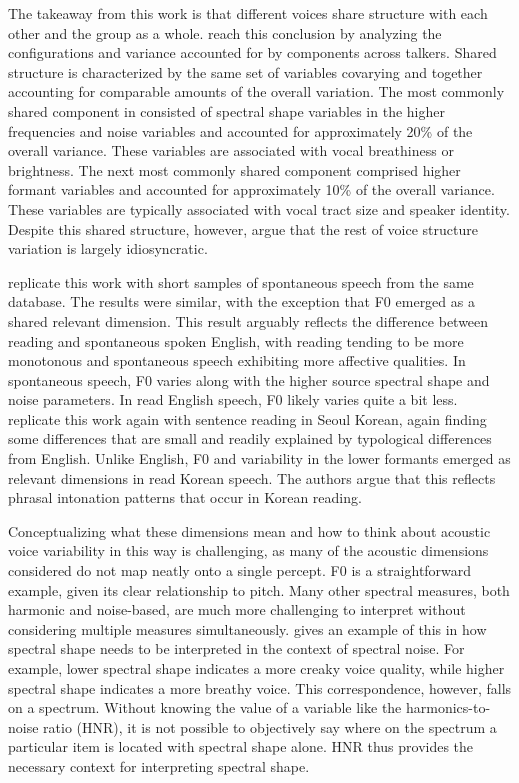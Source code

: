 The takeaway from this work is that different voices share structure with each other and the group as a whole. \citet{lee_2019_acoustic} reach this conclusion by analyzing the configurations and variance accounted for by components across talkers. Shared structure is characterized by the same set of variables covarying and together accounting for comparable amounts of the overall variation. The most commonly shared component in \citet{lee_2019_acoustic} consisted of spectral shape variables in the higher frequencies and noise variables and accounted for approximately 20\% of the overall variance. These variables are associated with vocal breathiness or brightness. The next most commonly shared component comprised higher formant variables and accounted for approximately 10\% of the overall variance. These variables are typically associated with vocal tract size and speaker identity. Despite this shared structure, however, \citet{lee_2019_acoustic} argue that the rest of voice structure variation is largely idiosyncratic. 

\citet{lee_2019_spontaneous} replicate this work with short samples of spontaneous speech from the same database. The results were similar, with the exception that F0 emerged as a shared relevant dimension. This result arguably reflects the difference between reading and spontaneous spoken English, with reading tending to be more monotonous and spontaneous speech exhibiting more affective qualities. In spontaneous speech, F0 varies along with the higher source spectral shape and noise parameters. In read English speech, F0 likely varies quite a bit less. \citet{lee_2020_language} replicate this work again with sentence reading in Seoul Korean, again finding some differences that are small and readily explained by typological differences from English. Unlike English, F0 and variability in the lower formants emerged as relevant dimensions in read Korean speech. The authors argue that this reflects phrasal intonation patterns that occur in Korean reading. 

Conceptualizing what these dimensions mean and how to think about acoustic voice variability in this way is challenging, as many of the acoustic dimensions considered do not map neatly onto a single percept. F0 is a straightforward example, given its clear relationship to pitch. Many other spectral measures, both harmonic and noise-based, are much more challenging to interpret without considering multiple measures simultaneously. \citet{garellek_2019_voice} gives an example of this in how spectral shape needs to be interpreted in the context of spectral noise. For example, lower spectral shape indicates a more creaky voice quality, while higher spectral shape indicates a more breathy voice. This correspondence, however, falls on a spectrum. Without knowing the value of a variable like the harmonics-to-noise ratio (HNR), it is not possible to objectively say where on the spectrum a particular item is located with spectral shape alone. HNR thus provides the necessary context for interpreting spectral shape. 

